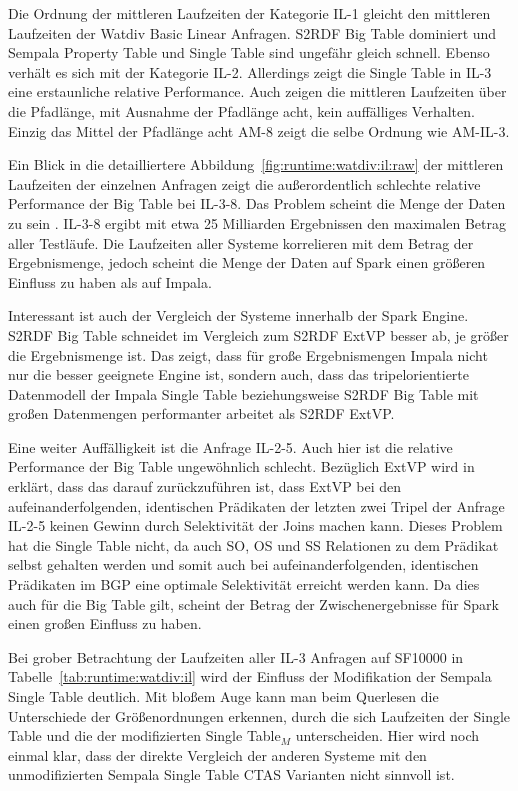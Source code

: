 \documentclass[
  a4paper,
  12pt,
  oneside,
  parskip=half,
  headsepline,
]{scrartcl}
\begin{document}
Die Ordnung der mittleren Laufzeiten der Kategorie IL-1 gleicht den mittleren
Laufzeiten der Watdiv Basic Linear Anfragen. S2RDF Big Table dominiert und
Sempala Property Table und Single Table sind ungefähr gleich schnell. Ebenso
verhält es sich mit der Kategorie IL-2. Allerdings zeigt die Single Table in
IL-3 eine erstaunliche relative Performance. Auch zeigen die mittleren
Laufzeiten über die Pfadlänge, mit Ausnahme der Pfadlänge acht, kein auffälliges
Verhalten. Einzig das Mittel der Pfadlänge acht AM-8 zeigt die selbe Ordnung wie
AM-IL-3.

Ein Blick in die detailliertere Abbildung~\ref{fig:runtime:watdiv:il:raw} der
mittleren Laufzeiten der einzelnen Anfragen zeigt die außerordentlich schlechte
relative Performance der Big Table bei IL-3-8. Das Problem scheint die 
Menge der Daten zu sein \cite{s2rdf}. IL-3-8 ergibt mit etwa 25 Milliarden
Ergebnissen den maximalen Betrag aller Testläufe. Die Laufzeiten aller
Systeme korrelieren mit dem Betrag der Ergebnismenge, jedoch scheint die
Menge der Daten auf Spark einen größeren Einfluss zu haben als auf Impala.

Interessant ist auch der Vergleich der Systeme innerhalb der Spark Engine. S2RDF
Big Table schneidet im Vergleich zum S2RDF ExtVP besser ab, je größer die
Ergebnismenge ist. Das zeigt, dass für große Ergebnismengen Impala nicht  nur
die besser geeignete Engine ist, sondern auch, dass das tripelorientierte
Datenmodell der Impala Single Table beziehungsweise S2RDF Big Table mit großen
Datenmengen performanter arbeitet als S2RDF ExtVP.

Eine weiter Auffälligkeit ist die Anfrage IL-2-5. Auch hier ist die relative
Performance der Big Table ungewöhnlich schlecht. Bezüglich ExtVP  wird in
\cite{s2rdf} erklärt, dass das darauf zurückzuführen ist, dass ExtVP bei den
aufeinanderfolgenden, identischen Prädikaten der letzten zwei Tripel der Anfrage
IL-2-5 keinen Gewinn durch Selektivität der Joins machen kann. Dieses Problem
hat die Single Table nicht, da auch SO, OS und SS Relationen zu dem Prädikat
selbst gehalten werden und somit auch bei aufeinanderfolgenden, identischen
Prädikaten im BGP eine optimale Selektivität erreicht werden kann. Da dies auch
für die Big Table gilt, scheint der Betrag der Zwischenergebnisse für Spark einen
großen Einfluss zu haben.

Bei grober Betrachtung der Laufzeiten aller IL-3 Anfragen auf SF10000 in
Tabelle~\ref{tab:runtime:watdiv:il} wird der Einfluss der Modifikation der
Sempala Single Table deutlich. Mit bloßem Auge kann man beim Querlesen die
Unterschiede der Größenordnungen erkennen, durch die sich Laufzeiten der
Single Table und die der modifizierten Single Table$_M$ unterscheiden. Hier wird
noch einmal klar, dass der direkte Vergleich der anderen Systeme mit den
unmodifizierten Sempala Single Table CTAS Varianten nicht sinnvoll ist.
\end{document}
